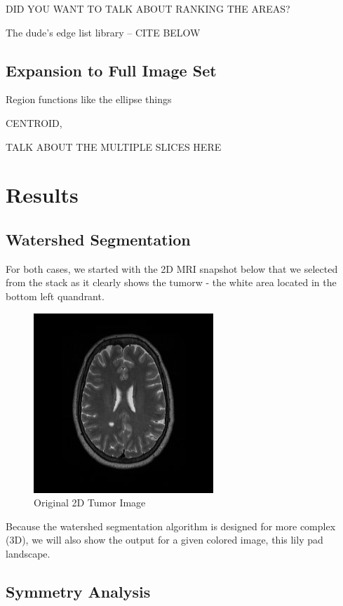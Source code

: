 \documentclass[12pt]{article}
\theoremstyle{plain}%
\theoremstyle{definition}
\theoremstyle{remark}
\begin{document}
DID YOU WANT TO TALK ABOUT RANKING THE AREAS?

The dude’s edge list library – CITE BELOW

\subsection{Expansion to Full Image Set}

Region functions like the ellipse things

CENTROID,

TALK ABOUT THE MULTIPLE SLICES HERE

\section{Results}

\subsection{Watershed Segmentation}

For both cases, we started with the 2D MRI snapshot below that we selected from the stack as it clearly shows the tumorw - the white area located in the bottom left quandrant.

\begin{figure}[!h]
	\centering
		\includegraphics{original.jpg}
	\caption{Original 2D Tumor Image}
\end{figure}

Because the watershed segmentation algorithm is designed for more complex (3D), we will also show the output for a given colored image, this lily pad landscape.

\subsection{Symmetry Analysis}
\end{document}
